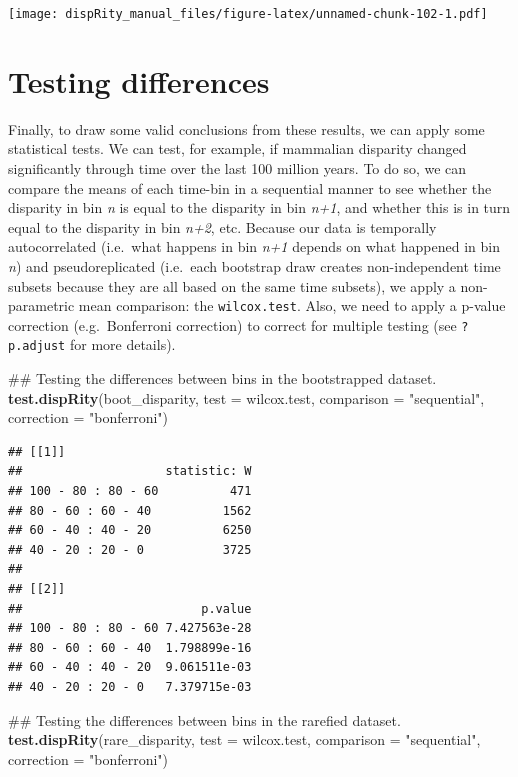 \documentclass[]{book}
\newenvironment{Shaded}{\begin{snugshade}}{\end{snugshade}}
\newcommand{\KeywordTok}[1]{\textcolor[rgb]{0.13,0.29,0.53}{\textbf{#1}}}
\newcommand{\DataTypeTok}[1]{\textcolor[rgb]{0.13,0.29,0.53}{#1}}
\newcommand{\StringTok}[1]{\textcolor[rgb]{0.31,0.60,0.02}{#1}}
\newcommand{\NormalTok}[1]{#1}
\theoremstyle{definition}
\theoremstyle{definition}
\theoremstyle{remark}
\begin{document}
\texttt{[image: dispRity\_manual\_files/figure-latex/unnamed-chunk-102-1.pdf]}

\section{Testing differences}\label{testing-differences}

Finally, to draw some valid conclusions from these results, we can apply
some statistical tests. We can test, for example, if mammalian disparity
changed significantly through time over the last 100 million years. To
do so, we can compare the means of each time-bin in a sequential manner
to see whether the disparity in bin \emph{n} is equal to the disparity
in bin \emph{n+1}, and whether this is in turn equal to the disparity in
bin \emph{n+2}, etc. Because our data is temporally autocorrelated
(i.e.~what happens in bin \emph{n+1} depends on what happened in bin
\emph{n}) and pseudoreplicated (i.e.~each bootstrap draw creates
non-independent time subsets because they are all based on the same time
subsets), we apply a non-parametric mean comparison: the
\texttt{wilcox.test}. Also, we need to apply a p-value correction
(e.g.~Bonferroni correction) to correct for multiple testing (see
\texttt{?p.adjust} for more details).

\begin{Shaded}
\begin{Highlighting}[]
\NormalTok{## Testing the differences between bins in the bootstrapped dataset.}
\KeywordTok{test.dispRity}\NormalTok{(boot_disparity, }\DataTypeTok{test =}\NormalTok{ wilcox.test, }\DataTypeTok{comparison =} \StringTok{"sequential"}\NormalTok{,}
    \DataTypeTok{correction =} \StringTok{"bonferroni"}\NormalTok{)}
\end{Highlighting}
\end{Shaded}

\begin{verbatim}
## [[1]]
##                    statistic: W
## 100 - 80 : 80 - 60          471
## 80 - 60 : 60 - 40          1562
## 60 - 40 : 40 - 20          6250
## 40 - 20 : 20 - 0           3725
## 
## [[2]]
##                         p.value
## 100 - 80 : 80 - 60 7.427563e-28
## 80 - 60 : 60 - 40  1.798899e-16
## 60 - 40 : 40 - 20  9.061511e-03
## 40 - 20 : 20 - 0   7.379715e-03
\end{verbatim}

\begin{Shaded}
\begin{Highlighting}[]
\NormalTok{## Testing the differences between bins in the rarefied dataset.}
\KeywordTok{test.dispRity}\NormalTok{(rare_disparity, }\DataTypeTok{test =}\NormalTok{ wilcox.test, }\DataTypeTok{comparison =} \StringTok{"sequential"}\NormalTok{,}
    \DataTypeTok{correction =} \StringTok{"bonferroni"}\NormalTok{)}
\end{Highlighting}
\end{Shaded}
\end{document}
